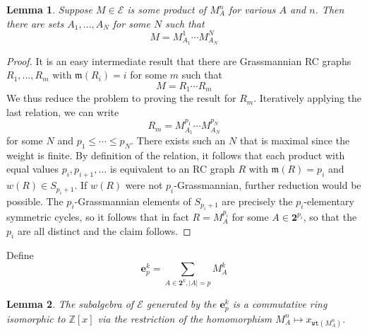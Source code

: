 \documentclass{amsart}
\newtheorem{lemma}{Lemma}[subsection]
\theoremstyle{definition}
\theoremstyle{remark}
\numberwithin{equation}{subsection}
\newcommand{\wtt}{\mathtt{wt}}
\newcommand{\maxd}{\mathfrak{m}}
\begin{document}
\begin{lemma}
Suppose $M\in\mathcal{E}$ is some product of $M_A^n$ for various $A$ and $n$. Then there are sets $A_1,\ldots,A_N$ for some $N$ such that
$$M = M_{A_1}^1\cdots M_{A_N}^N$$
\end{lemma}
\begin{proof}
It is an easy intermediate result that there are Grassmannian RC graphs $R_1,\ldots,R_m$ with $\maxd(R_i) = i$ for some $m$ such that
$$M=R_1\cdots R_m$$
We thus reduce the problem to proving the result for $R_m$. Iteratively applying the last relation, we can write 
$$R_m = M_{A_1}^{p_1}\cdots M_{A_N}^{p_N}$$
for some $N$ and $p_1\leq \cdots\leq p_N$. There exists such an $N$ that is maximal since the weight is finite. By definition of the relation, it follows that each product with equal values $p_i,p_{i+1},\ldots$ is equivalent to an RC graph $R$ with $\maxd(R) = p_i$ and $w(R)\in S_{p_i + 1}$. If $w(R)$ were not $p_i$-Grassmannian, further reduction would be possible. The $p_i$-Grassmannian elements of $S_{p_i+1}$ are precisely the $p_i$-elementary symmetric cycles, so it follows that in fact $R=M_A^{p_i}$ for some $A\in \mathbf{2}^{p_i}$, so that the $p_i$ are all distinct and the claim follows.
\end{proof}

Define 
$$\mathbf{e}_p^k = \sum_{A\in\mathbf{2}^k, |A|=p} M_A^k$$


\begin{lemma}
  The subalgebra of $\mathcal{E}$ generated by the $\mathbf{e}_p^k$ is a commutative ring isomorphic to $\mathbb{Z}[x]$ via the restriction of the homomorphism $M_A^n\mapsto x_{\wtt(M_A^n)}$.
\end{lemma}
\end{document}

